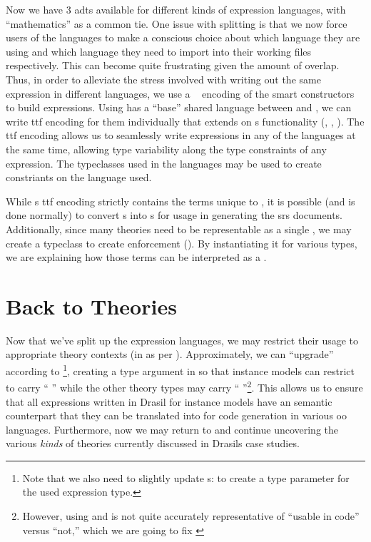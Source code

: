 Now we have 3 \acsp{adt} available for different kinds of expression languages,
with ``mathematics'' as a common tie. One issue with splitting is that we now
force users of the languages to make a conscious choice about which language
they are using and which language they need to import into their working files
respectively. This can become quite frustrating given the amount of overlap.
Thus, in order to alleviate the stress involved with writing out the same
expression in different languages, we use a ~\cite{Carette2009}
encoding of the smart constructors to build expressions. Using \Expr{} has a
``base'' shared language between \ModelExpr{} and \CodeExpr{}, we can write
\acs{ttf} encoding for them individually that extends on \Expr{}s functionality
(, ,
). The \acs{ttf} encoding allows us to seamlessly
write expressions in any of the languages at the same time, allowing type
variability along the type constraints of any expression. The typeclasses used
in the languages may be used to create constriants on the language used.

While \ModelExpr{}s \acs{ttf} encoding strictly contains the terms unique to
\ModelExpr{}, it is possible (and is done normally) to convert \Expr{}s into
\ModelExpr{}s for usage in generating the \acs{srs} documents. Additionally,
since many theories need to be representable as a single \Relation{}, we may
create a typeclass to create enforcement (). By
instantiating it for various types, we are explaining how those terms can be
interpreted as a \ModelExpr{}.

\currentExpressHaskell{}
 
\section{Back to Theories}
\label{chap:lang-division:sec:back-to-theories}

Now that we've split up the expression languages, we may restrict their usage to
appropriate theory contexts (in \ModelKinds{} as per ).
Approximately, we can ``upgrade'' \ModelKinds according to
\footnote{Note that we also need to slightly
update \QDefinition{}s:  to create a type
parameter for the used expression type.}, creating a type argument in
\ModelKinds{} so that instance models can restrict to carry ``\ModelKinds{}
\Expr{}'' while the other theory types may carry ``\ModelKinds{}
\ModelExpr{}''\footnote{However, using \Expr{} and \ModelExpr{} is not quite
accurately representative of ``usable in code'' versus ``not,'' which we are
going to fix \cite{DrasilIssue2853AlternativeModelKinds}}. This allows us to
ensure that all expressions written in Drasil for instance models have an
semantic counterpart that they can be translated into for code generation in
various \acs{oo} languages. Furthermore, now we may return to \ModelKinds{} and
continue uncovering the various \textit{kinds} of theories currently discussed
in Drasils case studies.

\pseudoPartialModelKindsUpgrade{}
